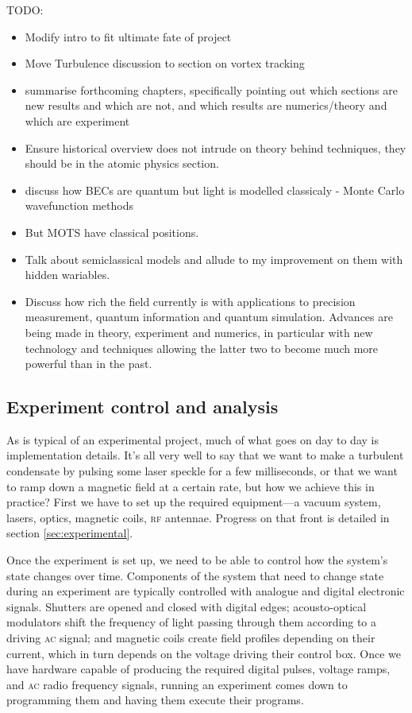 TODO:
\begin{itemize}
\item Modify intro to fit ultimate fate of project
\item Move Turbulence discussion to section on vortex tracking
\item summarise forthcoming chapters, specifically pointing out which sections are new results and which are not, and which results are numerics/theory and which are experiment
\item Ensure historical overview does not intrude on theory behind techniques, they should be in the atomic physics section.
\item discuss how BECs are quantum but light is modelled classicaly - Monte Carlo wavefunction methods
\item But MOTS have classical positions.
\item Talk about semiclassical models and allude to my improvement on them with hidden wariables.
\item Discuss how rich the field currently is with applications to precision measurement, quantum information and quantum simulation. Advances are being made in theory, experiment and numerics, in particular with new technology and techniques allowing the latter two to become much more powerful than in the past.
\end{itemize}


\subsection{Experiment control and analysis}

As is typical of an experimental project, much of what goes on day to day is implementation details. It's all very well to say that we want to make a turbulent condensate by pulsing some laser speckle for a few milliseconds, or that we want to ramp down a magnetic field at a certain rate, but how we achieve this in practice? First we have to set up the required equipment---a vacuum system, lasers, optics, magnetic coils, \textsc{rf} antennae. Progress on that front is detailed in section \ref{sec:experimental}.

Once the experiment is set up, we need to be able to control how the system's state changes over time. Components of the system that need to change state during an experiment are typically controlled with analogue and digital electronic signals. Shutters are opened and closed with digital edges; acousto-optical modulators shift the frequency of light passing through them according to a driving \textsc{ac} signal; and magnetic coils create field profiles depending on their current, which in turn depends on the voltage driving their control box. Once we have hardware capable of producing the required digital pulses, voltage ramps, and \textsc{ac} radio frequency signals, running an experiment comes down to programming them and having them execute their programs.


